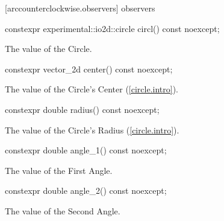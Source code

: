  [arccounterclockwise.observers]{ observers}

\begin{itemdecl}
constexpr experimental::io2d::circle circl() const noexcept;
\end{itemdecl}
\begin{itemdescr}
\pnum
\returns
The value of the Circle.
\end{itemdescr}

\begin{itemdecl}
constexpr vector_2d center() const noexcept;
\end{itemdecl}
\begin{itemdescr}
\pnum
\returns
The value of the Circle's Center (\ref{circle.intro}).
\end{itemdescr}

\begin{itemdecl}
constexpr double radius() const noexcept;
\end{itemdecl}
\begin{itemdescr}
\pnum
\returns
The value of the Circle's Radius (\ref{circle.intro}).
\end{itemdescr}

\begin{itemdecl}
constexpr double angle_1() const noexcept;
\end{itemdecl}
\begin{itemdescr}
\pnum
\returns
The value of the First Angle.
\end{itemdescr}

\begin{itemdecl}
constexpr double angle_2() const noexcept;
\end{itemdecl}
\begin{itemdescr}
\pnum
\returns
The value of the Second Angle.
\end{itemdescr}
